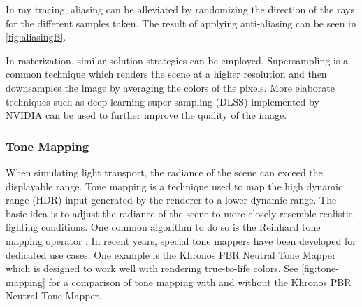 In ray tracing, aliasing can be alleviated by randomizing the direction of the rays for the different samples taken. The result of applying anti-aliasing can be seen in \autoref{fig:aliasingB}.

In rasterization, similar solution strategies can be employed. Supersampling is a common technique which renders the scene at a higher resolution and then downsamples the image by averaging the colors of the pixels. More elaborate techniques such as deep learning super sampling (DLSS) implemented by NVIDIA \cite{nvidiaDlss} can be used to further improve the quality of the image.

\subsubsection{Tone Mapping}
\label{sec:toneMappingTheory}

When simulating light transport, the radiance of the scene can exceed the displayable range. Tone mapping is a technique used to map the high dynamic range (\gls{HDR}) input generated by the renderer to a lower dynamic range. The basic idea is to adjust the radiance of the scene to more closely resemble realistic lighting conditions. One common algorithm to do so is the Reinhard tone mapping operator \cite{reinhardToneMapping}. In recent years, special tone mappers have been developed for dedicated use cases. One example is the Khronos \gls{PBR} Neutral Tone Mapper \cite{pbrNeutralToneMapping} which is designed to work well with rendering true-to-life colors. See \autoref{fig:tone-mapping} for a comparison of tone mapping with and without the Khronos \gls{PBR} Neutral Tone Mapper.

